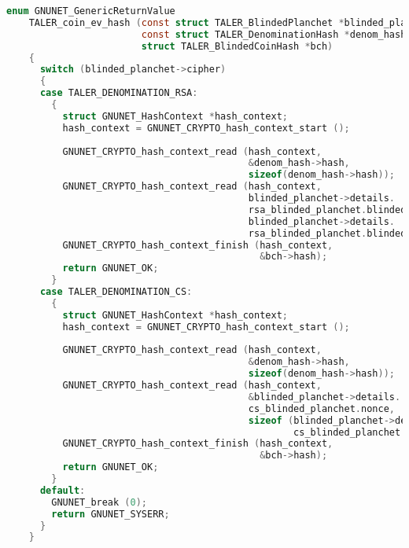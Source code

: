 \begin{lstlisting}[style=bfh-c,language=C, caption={Fixed idempotency check}, label={lst:fixed-idempotence}]
    enum GNUNET_GenericReturnValue
    TALER_coin_ev_hash (const struct TALER_BlindedPlanchet *blinded_planchet,
                        const struct TALER_DenominationHash *denom_hash,
                        struct TALER_BlindedCoinHash *bch)
    {
      switch (blinded_planchet->cipher)
      {
      case TALER_DENOMINATION_RSA:
        {
          struct GNUNET_HashContext *hash_context;
          hash_context = GNUNET_CRYPTO_hash_context_start ();
    
          GNUNET_CRYPTO_hash_context_read (hash_context,
                                           &denom_hash->hash,
                                           sizeof(denom_hash->hash));
          GNUNET_CRYPTO_hash_context_read (hash_context,
                                           blinded_planchet->details.
                                           rsa_blinded_planchet.blinded_msg,
                                           blinded_planchet->details.
                                           rsa_blinded_planchet.blinded_msg_size);
          GNUNET_CRYPTO_hash_context_finish (hash_context,
                                             &bch->hash);
          return GNUNET_OK;
        }
      case TALER_DENOMINATION_CS:
        {
          struct GNUNET_HashContext *hash_context;
          hash_context = GNUNET_CRYPTO_hash_context_start ();
    
          GNUNET_CRYPTO_hash_context_read (hash_context,
                                           &denom_hash->hash,
                                           sizeof(denom_hash->hash));
          GNUNET_CRYPTO_hash_context_read (hash_context,
                                           &blinded_planchet->details.
                                           cs_blinded_planchet.nonce,
                                           sizeof (blinded_planchet->details.
                                                   cs_blinded_planchet.nonce));
          GNUNET_CRYPTO_hash_context_finish (hash_context,
                                             &bch->hash);
          return GNUNET_OK;
        }
      default:
        GNUNET_break (0);
        return GNUNET_SYSERR;
      }
    }
\end{lstlisting}
